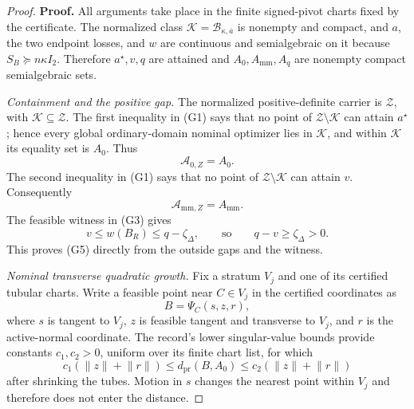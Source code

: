 \documentclass{article}
\begin{document}
\begin{proof}
\textbf{Proof.}
All arguments take place in the finite signed-pivot charts fixed by the certificate.  The normalized class \(\mathcal K=\mathcal B_{\kappa,\overline a}\) is nonempty and compact, and \(a\), the two endpoint losses, and \(w\) are continuous and semialgebraic on it because \(S_B\succeq n\kappa I_2\).  Therefore \(a^\star,v,q\) are attained and \(A_0,A_{\mathrm{mm}},A_q\) are nonempty compact semialgebraic sets.

\emph{Containment and the positive gap.}
The normalized positive-definite carrier is \(\mathcal Z\), with \(\mathcal K\subseteq\mathcal Z\).  The first inequality in (G1) says that no point of \(\mathcal Z\setminus\mathcal K\) can attain \(a^\star\); hence every global ordinary-domain nominal optimizer lies in \(\mathcal K\), and within \(\mathcal K\) its equality set is \(A_0\).  Thus
\[
\mathcal A_{0,Z}=A_0.
\tag{1}
\]
The second inequality in (G1) says that no point of \(\mathcal Z\setminus\mathcal K\) can attain \(v\).  Consequently
\[
\mathcal A_{\mathrm{mm},Z}=A_{\mathrm{mm}}.
\tag{2}
\]
The feasible witness in (G3) gives
\[
v\le w(B_R)\le q-\zeta_\Delta,
\qquad\text{so}\qquad
q-v\ge\zeta_\Delta>0.
\tag{3}
\]
This proves (G5) directly from the outside gaps and the witness.

\emph{Nominal transverse quadratic growth.}
Fix a stratum \(V_j\) and one of its certified tubular charts.  Write a feasible point near \(C\in V_j\) in the certified coordinates as
\[
B=\Psi_C(s,z,r),
\tag{4}
\]
where \(s\) is tangent to \(V_j\), \(z\) is feasible tangent and transverse to \(V_j\), and \(r\) is the active-normal coordinate.  The record's lower singular-value bounds provide constants \(c_1,c_2>0\), uniform over its finite chart list, for which
\[
c_1(\lVert z\rVert+\lVert r\rVert)
\le d_{\mathrm{pr}}(B,A_0)
\le c_2(\lVert z\rVert+\lVert r\rVert)
\tag{5}
\]
after shrinking the tubes.  Motion in \(s\) changes the nearest point within \(V_j\) and therefore does not enter the distance.


\end{proof}
\end{document}
